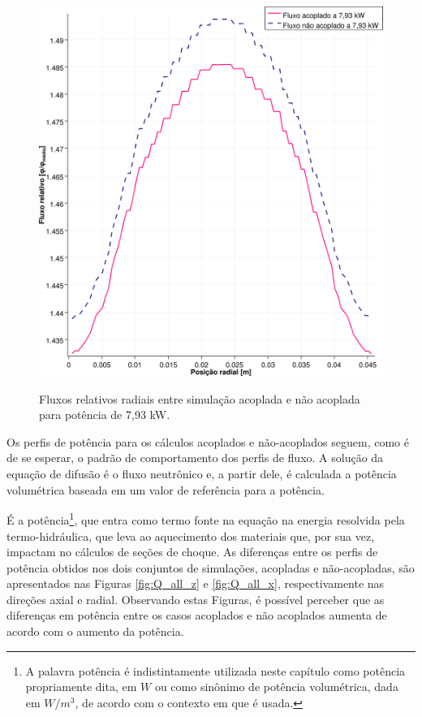 \begin{figure}[htb]
  \caption{Fluxos relativos radiais entre simulação acoplada e não acoplada para
    potência de 7,93 kW.}
  \centering\includegraphics[scale=0.5]{figuras/Flux_rel_x_200_port.png}
  \label{fig:flux_x_200}
\end{figure}

Os perfis de potência para os cálculos acoplados e não-acoplados seguem, como
é de se esperar, o padrão de comportamento dos perfis de fluxo. A solução da
equação de difusão é o fluxo neutrônico e, a partir
dele, é calculada a potência volumétrica baseada em um valor de referência para
a potência.

É a potência\footnote{A palavra potência é indistintamente utilizada neste capítulo como potência
  propriamente dita, em $W$ ou como sinônimo de potência volumétrica, dada em $W/m^3$, de acordo
  com o contexto em que é usada.}, que entra como termo fonte na equação na energia
resolvida pela termo-hidráulica, que leva ao aquecimento dos materiais que, por sua vez, impactam
no cálculos de seções de choque. As diferenças entre os perfis de potência obtidos nos dois conjuntos
de simulações, acopladas e não-acopladas, são apresentados nas Figuras \ref{fig:Q_all_z} e
\ref{fig:Q_all_x}, respectivamente nas direções axial e radial. Observando estas Figuras,
é possível perceber que as diferenças em potência entre os casos acoplados e
não acoplados aumenta de acordo com o aumento da potência.

